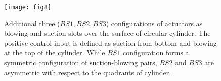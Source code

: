 \documentclass[standard]{jfm}
\begin{document}
%

\begin{figure}
\centering
\texttt{[image: fig8]} 
	\caption{ Additional three ($BS1,BS2,BS3$) configurations 
           of actuators as blowing and suction slots over 
           the surface of circular cylinder. 
           The positive control input is defined as 
           suction from bottom and blowing at the top of the cylinder. 
           While $BS1$ configuration forms a  symmetric configuration of 
           suction-blowing pairs,  
           $BS2$ and $BS3$ are asymmetric with respect to the quadrants of cylinder.}
	\label{fig:suctionbs123}
\end{figure}
\end{document}
